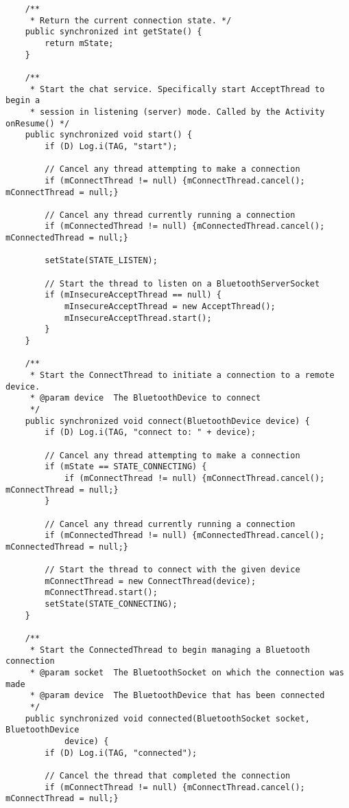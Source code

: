 \begin{verbatim}
    /**
     * Return the current connection state. */
    public synchronized int getState() {
        return mState;
    }

    /**
     * Start the chat service. Specifically start AcceptThread to begin a
     * session in listening (server) mode. Called by the Activity onResume() */
    public synchronized void start() {
        if (D) Log.i(TAG, "start");

        // Cancel any thread attempting to make a connection
        if (mConnectThread != null) {mConnectThread.cancel(); mConnectThread = null;}

        // Cancel any thread currently running a connection
        if (mConnectedThread != null) {mConnectedThread.cancel(); mConnectedThread = null;}

        setState(STATE_LISTEN);

        // Start the thread to listen on a BluetoothServerSocket
        if (mInsecureAcceptThread == null) {
            mInsecureAcceptThread = new AcceptThread();
            mInsecureAcceptThread.start();
        }
    }

    /**
     * Start the ConnectThread to initiate a connection to a remote device.
     * @param device  The BluetoothDevice to connect
     */
    public synchronized void connect(BluetoothDevice device) {
        if (D) Log.i(TAG, "connect to: " + device);

        // Cancel any thread attempting to make a connection
        if (mState == STATE_CONNECTING) {
            if (mConnectThread != null) {mConnectThread.cancel(); mConnectThread = null;}
        }

        // Cancel any thread currently running a connection
        if (mConnectedThread != null) {mConnectedThread.cancel(); mConnectedThread = null;}

        // Start the thread to connect with the given device
        mConnectThread = new ConnectThread(device);
        mConnectThread.start();
        setState(STATE_CONNECTING);
    }

    /**
     * Start the ConnectedThread to begin managing a Bluetooth connection
     * @param socket  The BluetoothSocket on which the connection was made
     * @param device  The BluetoothDevice that has been connected
     */
    public synchronized void connected(BluetoothSocket socket, BluetoothDevice
            device) {
        if (D) Log.i(TAG, "connected");

        // Cancel the thread that completed the connection
        if (mConnectThread != null) {mConnectThread.cancel(); mConnectThread = null;}


\end{verbatim}
